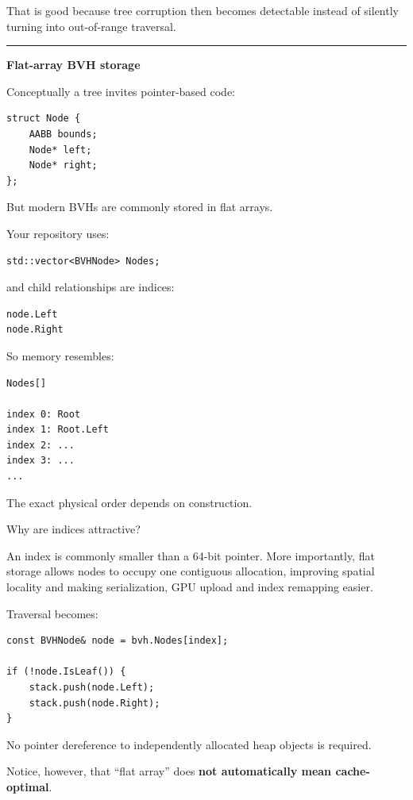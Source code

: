 That is good because tree corruption then becomes detectable instead of silently turning into out-of-range traversal.

\begin{center}\rule{0.5\linewidth}{0.5pt}\end{center}

\textbf{Flat-array BVH storage}

Conceptually a tree invites pointer-based code:

\begin{verbatim}
struct Node {
    AABB bounds;
    Node* left;
    Node* right;
};
\end{verbatim}

But modern BVHs are commonly stored in flat arrays.

Your repository uses:

\begin{verbatim}
std::vector<BVHNode> Nodes;
\end{verbatim}

and child relationships are indices:

\begin{verbatim}
node.Left
node.Right
\end{verbatim}

So memory resembles:

\begin{verbatim}
Nodes[]

index 0: Root
index 1: Root.Left
index 2: ...
index 3: ...
...
\end{verbatim}

The exact physical order depends on construction.

Why are indices attractive?

An index is commonly smaller than a 64-bit pointer. More importantly, flat storage allows nodes to occupy one contiguous allocation, improving spatial locality and making serialization, GPU upload and index remapping easier.

Traversal becomes:

\begin{verbatim}
const BVHNode& node = bvh.Nodes[index];

if (!node.IsLeaf()) {
    stack.push(node.Left);
    stack.push(node.Right);
}
\end{verbatim}

No pointer dereference to independently allocated heap objects is required.

Notice, however, that ``flat array'' does \textbf{not automatically mean cache-optimal}.

